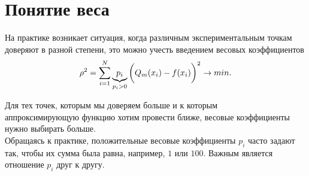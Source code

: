 \documentclass[a4paper,11pt]{article}
\begin{document}
\newpage
\section{Понятие веса}
На практике возникает ситуация, когда различным экспериментальным точкам доверяют в разной степени,
это можно учесть введением весовых коэффициентов
\begin{equation}
  \rho^2 = \sum_{i=1}^N \underbrace{p_i}_{p_i\footnotesize{>0}}\bigg(Q_m(x_i)-f(x_i)\bigg)^2 \rightarrow min.
\end{equation}

Для тех точек, которым мы доверяем больше и к которым \\ аппроксимирующую функцию хотим провести ближе,
весовые коэффициенты нужно выбирать больше. \\
Обращаясь к практике, положительные весовые коэффициенты $p_i$ часто задают так, чтобы их сумма была равна, например, $1$ или $100$.
Важным является отношение $p_i$ друг к другу.
\end{document}
